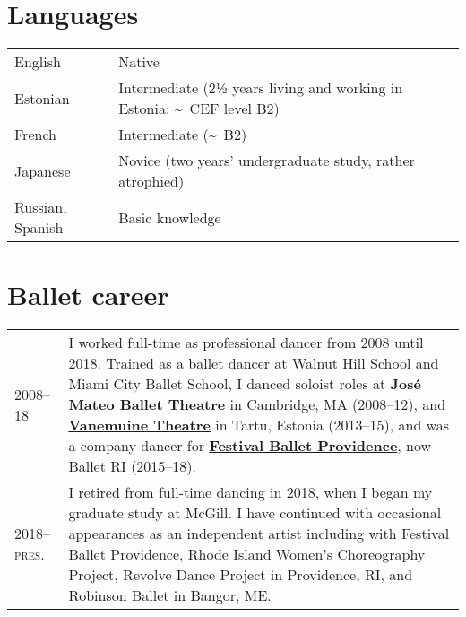 \documentclass[11pt,a4paper]{article}
\begin{document}
  \section{Languages}

  \begin{longtable}[l]{ll}
    English
    &%
      Native\\
    Estonian 
    &%
      Intermediate (2½ years living and working in Estonia:
      \textasciitilde\ CEF level B2)\\
    French 
    &%
      Intermediate (\textasciitilde\ B2)\\
    Japanese
    &%
      Novice (two years' undergraduate study, rather atrophied)\\
    Russian, Spanish%
    &%
      Basic knowledge\\
  \end{longtable}

  \section{Ballet career}
  \begin{longtable}{p{1.7cm}|p{15cm}}
    \textsc{2008--18}
    &%
    I worked full-time as professional dancer from 2008 until 2018. Trained as a
    ballet dancer at Walnut Hill School and Miami City Ballet School, I danced
    soloist roles at \textbf{José Mateo Ballet Theatre} in Cambridge, MA
    (2008--12), and \href{http://vanemuine.ee}{\textbf{Vanemuine Theatre}} in
    Tartu, Estonia (2013--15), and was a company dancer for
    \href{http://festivalballetprovidence.org}{\textbf{Festival Ballet
    Providence}}, now Ballet RI (2015--18).\\
    \textsc{2018--pres.}
    &%
    I retired from full-time dancing in 2018, when I began my graduate study at
    McGill. I have continued with occasional appearances as an independent
    artist including with Festival Ballet Providence,  Rhode Island Women's
    Choreography Project,  Revolve Dance Project in Providence, RI,
    and Robinson Ballet in Bangor, ME.\\
  \end{longtable}

  
\end{document}
